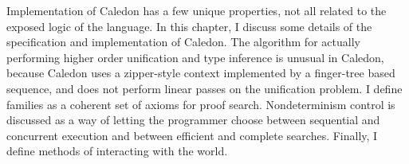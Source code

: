 Implementation of Caledon has a few unique properties, not all related to
the exposed logic of the language. In this chapter, I discuss some details of
the specification and implementation of Caledon. The algorithm for
actually performing higher order unification and type inference is unusual in Caledon, because
Caledon uses a zipper-style context implemented by a finger-tree based sequence, and does not
perform linear passes on the unification problem. I define families as a coherent set of
axioms for proof search. Nondeterminism control is discussed as a way of letting the programmer choose
between sequential and concurrent execution and between efficient and complete searches. Finally,
I define methods of interacting with the world.

